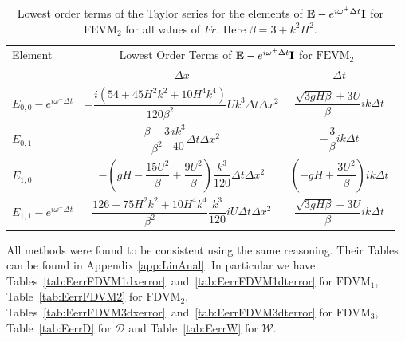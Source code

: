 \begin{table}
	\centering
	\begin{tabular}{l c c}
		\hline 
		Element & \multicolumn{2}{c}{Lowest Order Terms of $\mathbf{E} - e^{i \omega^+ \Delta t} \mathbf{I}$ for $\text{FEVM}_2$}\T \B  \\
		  \cline{2-3}
		& $\Delta x$&$\Delta t$\T \B  \\
		\hline
		$E_{0,0} -  e^{i \omega^+ \Delta t} $& $ -\dfrac{i \left(54 + 45H^2k^2 + 10H^4k^4\right)}{120\beta^2} U k^3 \Delta t \Delta x^2$ & $\dfrac{\sqrt{3gH \beta} + 3U}{\beta} ik \Delta t$ \T \B  \\
		$E_{0,1}$& $ \dfrac{\beta - 3}{\beta^2} \dfrac{ik^3}{40} \Delta  t\Delta x^2$ &  $ - \dfrac{3}{\beta} ik\Delta t$ \T \B  \\
		$E_{1,0}$& $ -\left(gH - \dfrac{15U^2}{\beta} + \dfrac{9U^2}{\beta}\right)  \dfrac{k^3}{120}\Delta t\Delta x^2$ &  $ \left(-gH + \dfrac{3U^2}{\beta}\right)ik \Delta t$ \T \B  \\
		$E_{1,1} -  e^{i \omega^+ \Delta t}$& $ \dfrac{126 + 75H^2 k^2 + 10 H^4 k^4}{\beta^2} \dfrac{k^3}{120} i U \Delta t\Delta x^2$ & $\dfrac{\sqrt{3gH \beta} - 3U}{\beta} ik \Delta t$ \T \B  \\\hline
	\end{tabular}
	\caption{Lowest order terms of the Taylor series for the elements of $\mathbf{E} - e^{i \omega^+ \Delta t} \mathbf{I}$ for $\text{FEVM}_2$ for all values of $Fr$. Here $\beta = 3 + k^2 H^2$.}
	\label{tab:EerrFEVM2} 
\end{table}

All methods were found to be consistent using the same reasoning. Their Tables can be found in Appendix \ref{app:LinAnal}. In particular we have Tables~\ref{tab:EerrFDVM1dxerror}~and~\ref{tab:EerrFDVM1dterror} for $\text{FDVM}_1$, Table~\ref{tab:EerrFDVM2} for $\text{FDVM}_2$, Tables~\ref{tab:EerrFDVM3dxerror}~and~\ref{tab:EerrFDVM3dterror} for $\text{FDVM}_3$, Table~\ref{tab:EerrD} for $\mathcal{D}$ and Table~\ref{tab:EerrW} for $\mathcal{W}$. 

